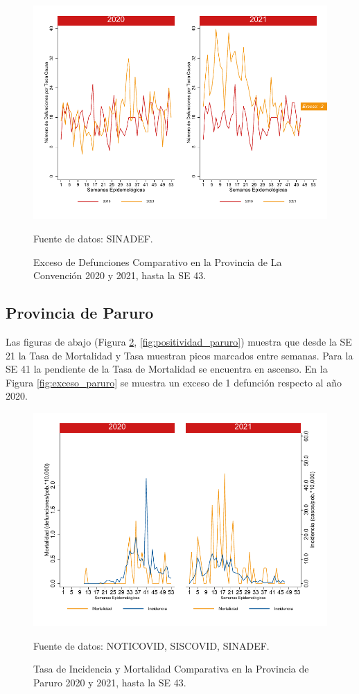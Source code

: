 \documentclass[12pt,a4paper,openany]{book}
\begin{document}
		\begin{figure}[h]
			\caption{Exceso de Defunciones Comparativo en la Provincia de La Convención 2020 y 2021, hasta la SE 43.}\label{fig:exceso_laconv}
			\begin{center}
				\includegraphics[width=0.7\linewidth]{../figuras/exceso_9}
			\end{center}
			{\footnotesize {Fuente de datos: SINADEF.}}
		\end{figure}
		
		\clearpage
		
		\subsection*{Provincia de Paruro}
		\noindent Las figuras de abajo (Figura \ref{fig:inc_mort_paruro}, \ref{fig:positividad_paruro})  muestra que desde la SE 21 la Tasa de Mortalidad y Tasa muestran picos marcados entre semanas. Para la SE 41 la pendiente de la Tasa de Mortalidad se encuentra en ascenso. En la Figura \ref{fig:exceso_paruro} se muestra un exceso de 1 defunción respecto al año 2020.
		
		\begin{figure}[h]
			\caption{Tasa de Incidencia y Mortalidad Comparativa en la Provincia de Paruro 2020 y 2021, hasta la SE 43.}\label{fig:inc_mort_paruro}
			\begin{center}
				\includegraphics[width=0.7\linewidth]{../figuras/incidencia_mortalidad_20_21_10}
			\end{center}
			{\footnotesize {Fuente de datos: NOTICOVID, SISCOVID, SINADEF.}}
		\end{figure}
		
\end{document}
